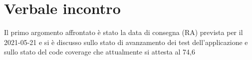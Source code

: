 \section{Verbale incontro}
Il primo argomento affrontato è stato la data di consegna (RA) prevista per il 2021-05-21 e si è discusso sullo stato di avanzamento
dei test dell'applicazione e sullo stato del code coverage che attualmente si attesta al 74,6%
